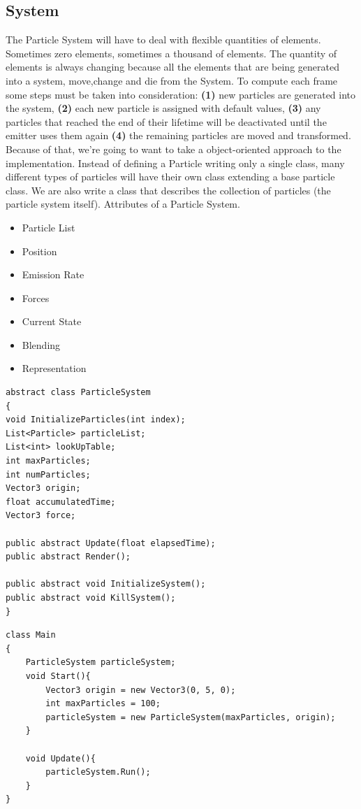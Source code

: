 \subsection{System}
The Particle System will have to deal with flexible quantities of elements. Sometimes zero elements, sometimes a thousand of elements. The quantity of elements is always changing because all the elements that are being generated into a system, move,change and die from the System. To compute each frame some steps must be taken into consideration: \textbf{(1)} new particles are generated into the system, \textbf{(2)} each new particle is assigned with default values, \textbf{(3)} any particles that reached the end of their lifetime will be deactivated until the emitter uses them again \textbf{(4)} the remaining particles are moved and transformed. Because of that, we're going to want to take a object-oriented approach to the implementation. Instead of defining a Particle writing only a single class, many different types of particles will have their own class extending a base particle class. We are also write a class that describes the collection of particles (the particle system itself).
Attributes of a Particle System.
\begin{itemize}
	\item Particle List
	\item Position
	\item Emission Rate
	\item Forces
	\item Current State
	\item Blending
	\item Representation
\end{itemize}

\begin{lstlisting}
abstract class ParticleSystem
{
void InitializeParticles(int index);
List<Particle> particleList;
List<int> lookUpTable;
int maxParticles;
int numParticles;
Vector3 origin;
float accumulatedTime;
Vector3 force;

public abstract Update(float elapsedTime);
public abstract Render();

public abstract void InitializeSystem();
public abstract void KillSystem();
}
\end{lstlisting}

\begin{lstlisting}
class Main
{
	ParticleSystem particleSystem;
	void Start(){
		Vector3 origin = new Vector3(0, 5, 0);
		int maxParticles = 100;
		particleSystem = new ParticleSystem(maxParticles, origin);
	}

	void Update(){
		particleSystem.Run();
	}
}
\end{lstlisting}

